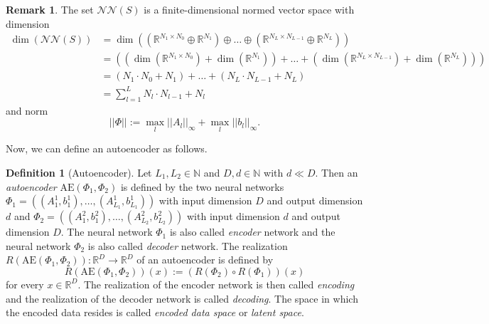 \documentclass[11pt,titlepage]{article}
\newcommand{\R}{\mathbb{R}} %
\newcommand{\N}{\mathbb{N}} %
\newcommand{\abs}[1]{{\left| #1 \right|}}
\theoremstyle{definition}
\newtheorem{definition}[theorem]{Definition}
\newtheorem{remark}[theorem]{Remark}
\theoremstyle{remark}
\begin{document}
	
	\begin{remark}
		The set $\mathcal{N}\mathcal{N}(S)$ is a finite-dimensional normed vector space with dimension
		\begin{align*}
			\dim(\mathcal{N}\mathcal{N}(S))&=\dim\left(\left(
			\mathbb{R}^{N_{1}\times N_0}\oplus\mathbb{R}^{N_1}\right)
			\oplus\ldots\oplus\left(\mathbb{R}^{N_{L}\times N_{L-1}}
			\oplus\mathbb{R}^{N_L}\right)\right)\\
			&=\left(\left(
			\dim\left(\mathbb{R}^{N_{1}\times N_0}\right)+\dim\left(\mathbb{R}^{N_1}\right)
			\right)
			+\ldots+\left(\dim\left(\mathbb{R}^{N_{L}\times N_{L-1}}
			\right)+\dim\left(\mathbb{R}^{N_L}\right)\right)\right)\\
			&=(N_1\cdot N_0+N_1)+\ldots+(N_{L}\cdot N_{L-1}+N_L)\\
			&=\sum_{l=1}^L N_{l}\cdot N_{l-1}+N_l
		\end{align*}
		and norm 
		\[\abs{\abs{\Phi}}:=\max_l \abs{\abs{A_l}}_{\infty}+
		\max_l \abs{\abs{b_l}}_{\infty}.\]
	\end{remark}
	\newpage
	
	Now, we can define an autoencoder as follows.
	
	\begin{definition}[Autoencoder]\label{Def autoencoder}
		Let $L_1,L_2\in\N$ and $D,d\in\N$ with $d\ll D$. Then an \textsl{autoencoder} $\mathrm{AE}(\Phi_1,\Phi_2)$ is defined by the two neural networks $\Phi_1 = ((A_1^1, b_1^1),\ldots,(A_{L_1}^1, b_{L_1}^1))$ with input dimension $D$ and output dimension 
		$d$ and 
		$\Phi_2 = ((A_1^2, b_1^2),\ldots,(A_{L_2}^2, b_{L_2}^2))$ with input dimension $d$ 
		and output dimension $D$. 
		The neural network $\Phi_1$ is also called \textsl{encoder} network and the 
		neural network $\Phi_2$ is also called \textsl{decoder} network. 
		The realization $R(\mathrm{AE}(\Phi_1, \Phi_2)) : \R^D\to \R^D$ of an
		autoencoder is defined by
		\[R(\mathrm{AE}(\Phi_1, \Phi_2))(x) := (R(\Phi_2)\circ R(\Phi_1))(x)\]
		for every $x\in\R^D$. The realization of the encoder network is then called \textsl{encoding} and the realization of the decoder network is called \textsl{decoding}. The space in which the encoded data resides is called \textsl{encoded data space} or \textsl{latent space}.
	\end{definition}
	
	\newpage
\end{document}

